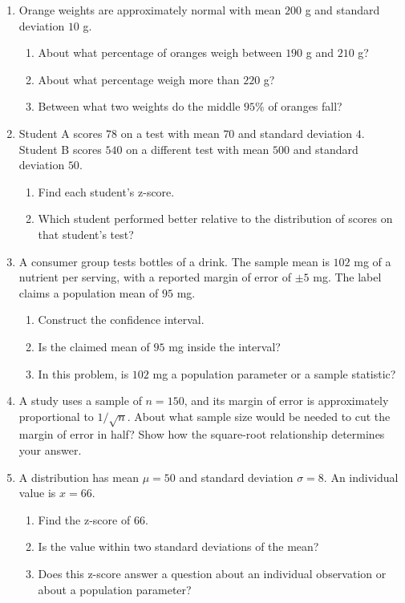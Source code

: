 \documentclass[11pt]{article}
\newcommand{\worklarge}{\par\vspace{0.92in}}
\newcommand{\workxl}{\par\vspace{1.22in}}
\begin{document}
\begin{enumerate}
\item Orange weights are approximately normal with mean \(200\) g and standard deviation \(10\) g.
\begin{enumerate}[label=(\alph*),itemsep=4pt]
\item About what percentage of oranges weigh between \(190\) g and \(210\) g?
\item About what percentage weigh more than \(220\) g?
\item Between what two weights do the middle \(95\%\) of oranges fall?
\end{enumerate}
\worklarge

\item Student A scores \(78\) on a test with mean \(70\) and standard deviation \(4\). Student B scores \(540\) on a different test with mean \(500\) and standard deviation \(50\).
\begin{enumerate}[label=(\alph*),itemsep=4pt]
\item Find each student's z-score.
\item Which student performed better relative to the distribution of scores on that student's test?
\end{enumerate}
\worklarge

\item A consumer group tests bottles of a drink. The sample mean is \(102\) mg of a nutrient per serving, with a reported margin of error of \(\pm5\) mg. The label claims a population mean of \(95\) mg.
\begin{enumerate}[label=(\alph*),itemsep=4pt]
\item Construct the confidence interval.
\item Is the claimed mean of \(95\) mg inside the interval?
\item In this problem, is \(102\) mg a population parameter or a sample statistic?
\end{enumerate}
\workxl

\item A study uses a sample of \(n=150\), and its margin of error is approximately proportional to \(1/\sqrt n\). About what sample size would be needed to cut the margin of error in half? Show how the square-root relationship determines your answer.
\worklarge

\item A distribution has mean \(\mu=50\) and standard deviation \(\sigma=8\). An individual value is \(x=66\).
\begin{enumerate}[label=(\alph*),itemsep=4pt]
\item Find the z-score of \(66\).
\item Is the value within two standard deviations of the mean?
\item Does this z-score answer a question about an individual observation or about a population parameter?
\end{enumerate}
\worklarge
\end{enumerate}
\end{document}
